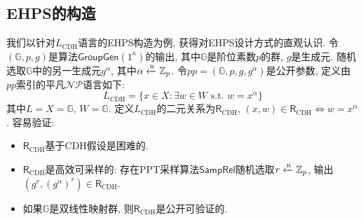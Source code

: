 \subsection{EHPS的构造}
我们以针对$L_\text{CDH}$语言的EHPS构造为例, 获得对EHPS设计方式的直观认识. 
令$(\mathbb{G}, p, g)$是算法$\mathsf{GroupGen}(1^\kappa)$的输出, 其中$\mathbb{G}$是阶位素数$p$的群, 
$g$是生成元. 随机选取$\mathbb{G}$中的另一生成元$g^\alpha$, 其中$\alpha \xleftarrow{\textup{\tiny R}} \mathbb{Z}_p$. 
令$pp = (\mathbb{G}, p, g, g^\alpha)$是公开参数, 定义由$pp$索引的平凡$\mathcal{NP}$语言如下:  
\begin{equation*}
	L_\text{CDH} = \{x \in X: \exists w \in W \text{~s.t.~} w = x^\alpha\}
\end{equation*}
其中$L = X = \mathbb{G}$, $W = \mathbb{G}$. 
定义$L_\text{CDH}$的二元关系为$\mathsf{R}_\text{CDH}$,	$(x, w) \in \mathsf{R}_\text{CDH} \iff w = x^\alpha$. 
容易验证: 
\begin{itemize}
	\item $\mathsf{R}_\text{CDH}$基于CDH假设是困难的. 
	
	\item $\mathsf{R}_\text{CDH}$是高效可采样的: 存在PPT采样算法$\mathsf{SampRel}$随机选取$r \xleftarrow{\textup{\tiny R}} \mathbb{Z}_p$, 
		输出 $(g^r, (g^{\alpha})^r) \in \mathsf{R}_\text{CDH}$. 

    \item 如果$\mathbb{G}$是双线性映射群, 则$\mathsf{R}_\text{CDH}$是公开可验证的.  
\end{itemize}


